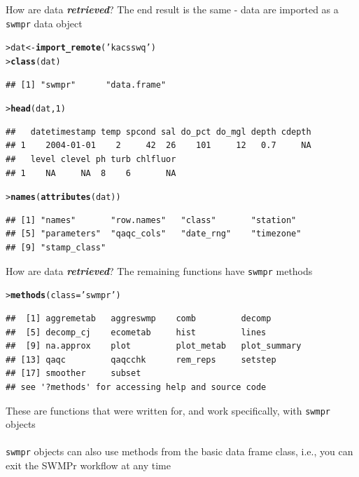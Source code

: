 \documentclass[serif]{beamer}\usepackage[]{graphicx}\usepackage[]{color}
\makeatletter
\newcommand{\hlnum}[1]{\textcolor[rgb]{0.686,0.059,0.569}{#1}}%
\newcommand{\hlstr}[1]{\textcolor[rgb]{0.192,0.494,0.8}{#1}}%
\newcommand{\hlstd}[1]{\textcolor[rgb]{0.345,0.345,0.345}{#1}}%
\newcommand{\hlkwb}[1]{\textcolor[rgb]{0.69,0.353,0.396}{#1}}%
\newcommand{\hlkwc}[1]{\textcolor[rgb]{0.333,0.667,0.333}{#1}}%
\newcommand{\hlkwd}[1]{\textcolor[rgb]{0.737,0.353,0.396}{\textbf{#1}}}%
\newenvironment{kframe}{%
 \def\at@end@of@kframe{}%
 \ifinner\ifhmode%
  \def\at@end@of@kframe{\end{minipage}}%
  \begin{minipage}{\columnwidth}%
 \fi\fi%
 \def\FrameCommand##1{\hskip\@totalleftmargin \hskip-\fboxsep
 \colorbox{shadecolor}{##1}\hskip-\fboxsep
     \hskip-\linewidth \hskip-\@totalleftmargin \hskip\columnwidth}%
 \MakeFramed {\advance\hsize-\width
   \@totalleftmargin\z@ \linewidth\hsize
   \@setminipage}}%
 {\par\unskip\endMakeFramed%
 \at@end@of@kframe}
\newenvironment{knitrout}{}{} %
\newcommand{\Bigtxt}[1]{\textbf{\textit{#1}}}
\makeatother
\begin{document}
\begin{frame}{How are data \Bigtxt{retrieved}?}
The end result is the same - data are imported as a \texttt{swmpr} data object
\begin{knitrout}\small
{}\color{fgcolor}\begin{kframe}
\begin{alltt}
\hlstd{> }\hlstd{dat} \hlkwb{<-} \hlkwd{import_remote}\hlstd{(}\hlstr{'kacsswq'}\hlstd{)}
\hlstd{> }\hlkwd{class}\hlstd{(dat)}
\end{alltt}
\begin{verbatim}
## [1] "swmpr"      "data.frame"
\end{verbatim}
\begin{alltt}
\hlstd{> }\hlkwd{head}\hlstd{(dat,} \hlnum{1}\hlstd{)}
\end{alltt}
\begin{verbatim}
##   datetimestamp temp spcond sal do_pct do_mgl depth cdepth
## 1    2004-01-01    2     42  26    101     12   0.7     NA
##   level clevel ph turb chlfluor
## 1    NA     NA  8    6       NA
\end{verbatim}
\begin{alltt}
\hlstd{> }\hlkwd{names}\hlstd{(}\hlkwd{attributes}\hlstd{(dat))}
\end{alltt}
\begin{verbatim}
## [1] "names"       "row.names"   "class"       "station"    
## [5] "parameters"  "qaqc_cols"   "date_rng"    "timezone"   
## [9] "stamp_class"
\end{verbatim}
\end{kframe}
\end{knitrout}
\end{frame}

\begin{frame}[fragile,t]{How are data \Bigtxt{retrieved}?}
The remaining functions have \texttt{swmpr} methods
\begin{knitrout}\small
{}\color{fgcolor}\begin{kframe}
\begin{alltt}
\hlstd{> }\hlkwd{methods}\hlstd{(}\hlkwc{class} \hlstd{=} \hlstr{'swmpr'}\hlstd{)}
\end{alltt}
\begin{verbatim}
##  [1] aggremetab   aggreswmp    comb         decomp      
##  [5] decomp_cj    ecometab     hist         lines       
##  [9] na.approx    plot         plot_metab   plot_summary
## [13] qaqc         qaqcchk      rem_reps     setstep     
## [17] smoother     subset      
## see '?methods' for accessing help and source code
\end{verbatim}
\end{kframe}
\end{knitrout}
These are functions that were written for, and work specifically, with \texttt{swmpr} objects \\~\\
\texttt{swmpr} objects can also use methods from the basic data frame class, i.e., you can exit the SWMPr workflow at any time
\end{frame}
\end{document}

